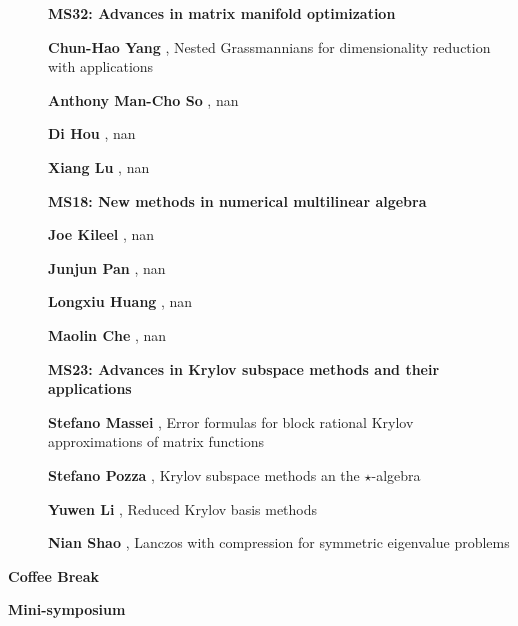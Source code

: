 \documentclass[ILAS2025-program.tex]{subfiles}
\begin{document}
\begin{description}
    \begin{description}
    \item[] {\color{mstitle}\textbf{MS32: Advances in matrix manifold optimization}} 
    \item[] \textbf{Chun-Hao Yang} , Nested Grassmannians for dimensionality reduction with applications
        \item[] \textbf{Anthony Man-Cho So} , nan
        \item[] \textbf{Di Hou} , nan
        \item[] \textbf{Xiang Lu} , nan
        \end{description}
    \begin{description}
    \item[] {\color{mstitle}\textbf{MS18: New methods in numerical multilinear algebra}} 
    \item[] \textbf{Joe Kileel} , nan
        \item[] \textbf{Junjun Pan} , nan
        \item[] \textbf{Longxiu Huang} , nan
        \item[] \textbf{Maolin Che} , nan
        \end{description}
    \begin{description}
    \item[] {\color{mstitle}\textbf{MS23: Advances in Krylov subspace methods and their applications}} 
    \item[] \textbf{Stefano Massei} , Error formulas for block rational Krylov approximations of matrix functions
        \item[] \textbf{Stefano Pozza} , Krylov subspace methods an the $\star$-algebra
        \item[] \textbf{Yuwen Li} , Reduced Krylov basis methods
        \item[] \textbf{Nian Shao} , Lanczos with compression for symmetric eigenvalue problems
        \end{description}
    \item[\info{15:30\textrm{--}16:00}] \textbf{Coffee Break} 
    \item[\info{16:00\textrm{--}18:00}] \textbf{Mini-symposium} 

\end{description}
\end{document}
